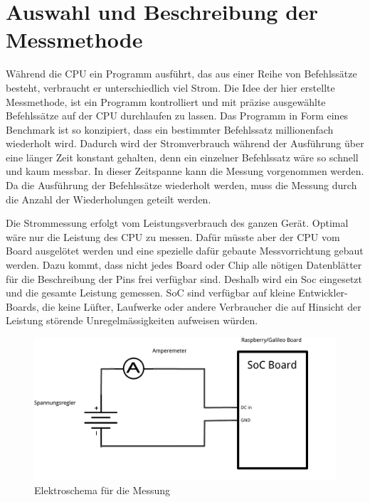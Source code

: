 \section{Auswahl und Beschreibung der Messmethode}
\label{chap:auswahl_beschreibung_methode}

Während die CPU ein Programm ausführt, das aus einer Reihe von Befehlssätze besteht, verbraucht er unterschiedlich viel Strom. Die Idee der hier erstellte Messmethode, ist ein Programm kontrolliert und mit präzise ausgewählte Befehlssätze auf der CPU durchlaufen zu lassen. Das Programm in Form eines Benchmark ist so konzipiert, dass ein bestimmter Befehlssatz millionenfach wiederholt wird. Dadurch wird der Stromverbrauch während der Ausführung über eine länger Zeit konstant gehalten, denn ein einzelner Befehlssatz wäre so schnell und kaum messbar. In dieser Zeitspanne kann die Messung vorgenommen werden. Da die Ausführung der Befehlssätze wiederholt werden, muss die Messung durch die Anzahl der Wiederholungen geteilt werden.
\par
Die Strommessung erfolgt vom Leistungsverbrauch des ganzen Gerät. Optimal wäre nur die Leistung des CPU zu messen. Dafür müsste aber der CPU vom Board ausgelötet werden und eine spezielle dafür gebaute Messvorrichtung gebaut werden. Dazu kommt, dass nicht jedes Board oder Chip alle nötigen Datenblätter für die Beschreibung der Pins frei verfügbar sind. Deshalb wird ein Soc eingesetzt und die gesamte Leistung gemessen. SoC sind verfügbar auf kleine Entwickler-Boards, die keine Lüfter, Laufwerke oder andere Verbraucher die  auf Hinsicht der Leistung störende Unregelmässigkeiten aufweisen würden.



\begin{figure}
\centering
\includegraphics[scale=0.5]{images/schema.pdf}
\caption{Elektroschema für die Messung}
\label{fig:Elektroschema}
\end{figure}



